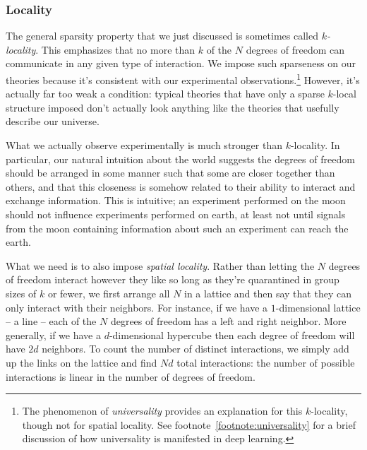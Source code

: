 \documentclass[12pt]{article}
\begin{document}
\subsubsection*{Locality}
The general sparsity property that we just discussed is sometimes called \emph{$k$-locality}. This emphasizes that no more than $k$ of the $N$ degrees of freedom can communicate in any given type of interaction. We impose such sparseness on our theories because it's consistent with our experimental observations.\footnote{
    The phenomenon of \emph{universality} provides an explanation for this $k$-locality, though not for spatial locality. See footnote~\ref{footnote:universality} for a brief discussion of how universality is manifested in deep learning.
}
However, it's actually far too weak a condition: typical theories that have only a sparse $k$-local structure imposed don't actually look anything like the theories that usefully describe our universe. 

What we actually observe experimentally is much stronger than $k$-locality. 
In particular, our natural intuition about the world suggests the degrees of freedom should be arranged in some manner such that some are closer together than others, and that this closeness is somehow related to their ability to interact and exchange information. This is intuitive; an experiment performed on the moon should not influence experiments performed on earth, at least not until signals from the moon containing information about such an experiment can reach the earth. 

What we need is to also impose \emph{spatial locality}. Rather than letting the $N$ degrees of freedom interact however they like so long as they're quarantined in group sizes of $k$ or fewer, we first arrange all $N$ in a lattice and then say that they can only interact with their neighbors. For instance, if we have a $1$-dimensional lattice -- a line -- each of the $N$ degrees of freedom has a left and right neighbor. More generally, if we have a $d$-dimensional hypercube then each degree of freedom will have $2d$ neighbors. To count the number of distinct interactions, we simply add up the links on the lattice and find $Nd$ total interactions: the number of possible interactions is linear in the number of degrees of freedom. 
\end{document}
